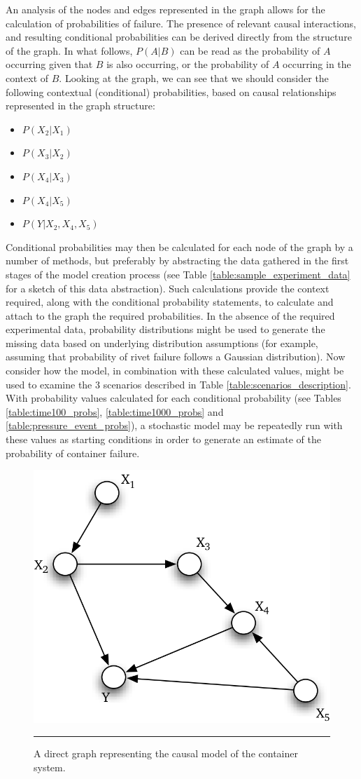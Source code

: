 \newpage\noindent An analysis of the nodes and edges represented in the graph allows for the calculation of probabilities of failure. The presence of relevant causal interactions, and resulting conditional probabilities can be  derived directly from the structure of the graph. \newl In what follows, $P(A|B)$ can be read as the probability of $A$ occurring given that $B$ is also occurring, or the probability of $A$ occurring in the context of $B$. Looking at the graph, we can see that we should consider the following contextual (conditional) probabilities, based on causal relationships represented in the graph structure:
\begin{itemize}[noitemsep]
\item $P(X_2|X_1)$
\item $P(X_3|X_2)$
\item $P(X_4|X_3)$
\item $P(X_4|X_5)$
\item $P(Y|X_2,X_4,X_5)$
\end{itemize}
Conditional probabilities may then be calculated for each node of the graph by a number of methods, but preferably by abstracting the data gathered in the first stages of the model creation process (see Table \ref{table:sample_experiment_data} for a sketch of this data abstraction). Such calculations provide the context required, along with the conditional probability statements, to calculate and attach to the graph the required probabilities. In the absence of the required experimental data, probability distributions might be used to generate the missing data based on underlying distribution assumptions (for example, assuming that probability of rivet failure follows a Gaussian distribution).
\newl Now consider how the model, in combination with these calculated values, might be used to examine the 3 scenarios described in Table \ref{table:scenarios_description}. With probability values calculated for each conditional probability (see Tables \ref{table:time100_probs}, \ref{table:time1000_probs} and \ref{table:pressure_event_probs}), a stochastic model may be repeatedly run with these values as starting conditions in order to generate an estimate of the probability of container failure.
\begin{figure}[t] %
   \centering
    \includegraphics[width=0.4\columnwidth]{images/SIM/methodexamplegraphv3.png} 
   \small\caption[Causal graph]{A direct graph representing the causal model of the container system.}\label{fig:causal_graph}\normalsize\hrule
\end{figure}
